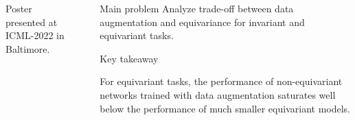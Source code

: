 \documentclass[
                20pt,
                final,
                hyperref={%
                    breaklinks=true,%
                    letterpaper=true,%
                    colorlinks,%
                    bookmarks=false%
                }]{beamer}
\newlength{\sepwid}
\newlength{\onecolwid}
\newlength{\twocolwid}
\newlength{\midwid}
\begin{document}
\begin{frame}[t]
\begin{columns}[t]
\begin{column}{\onecolwid}
                \vfill
                \noindent\footnotesize{Poster presented at ICML-2022 in Baltimore.}
            \end{column}

            \begin{column}{\sepwid}
            \end{column}


            \begin{column}{\twocolwid}
                \vspace{-.6in}


                \begin{alertblock}{\Large{Main problem}}
                    \centering
                    Analyze trade-off between data augmentation and equivariance for invariant and equivariant tasks.
                \end{alertblock}
                \medskip
                \begin{alertblock}{\Large{Key takeaway}}
                    \centering
                    \setlength{\columnsep}{60pt}
                    \begin{multicols}{2}
                        For equivariant tasks, the performance of non-equivariant networks trained with data augmentation saturates well below the performance of much smaller equivariant models.


\end{multicols}
\end{alertblock}
\end{column}
\end{columns}
\end{frame}
\end{document}

